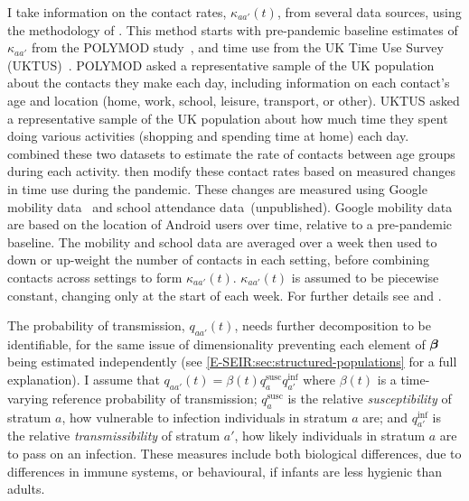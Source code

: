\documentclass[thesis.tex]{subfiles}
\begin{document}
I take information on the contact rates, $\kappa_{aa'}(t)$, from several data sources, using the methodology of \textcite{vanleeuwenTime,vanleeuwenAugmenting}.
This method starts with pre-pandemic baseline estimates of $\kappa_{aa'}$ from the POLYMOD study~\autocite{mossongSocial}, and time use from the UK Time Use Survey (UKTUS)~\autocite{UKTUS}.
POLYMOD asked a representative sample of the UK population about the contacts they make each day, including information on each contact's age and location (home, work, school, leisure, transport, or other).
UKTUS asked a representative sample of the UK population about how much time they spent doing various activities (\eg shopping and spending time at home) each day.
\Textcite{vanleeuwenAugmenting} combined these two datasets to estimate the rate of contacts between age groups during each activity.
\Textcite{birrellRealtime} then modify these contact rates based on measured changes in time use during the pandemic.
These changes are measured using Google mobility data~\autocite{googleCOVID19} and school attendance data~(unpublished).
Google mobility data are based on the location of Android users over time, relative to a pre-pandemic baseline.
The mobility and school data are averaged over a week then used to down or up-weight the number of contacts in each setting, before combining contacts across settings to form $\kappa_{aa'}(t)$.
$\kappa_{aa'}(t)$ is assumed to be piecewise constant, changing only at the start of each week.
For further details see \textcite{vanleeuwenAugmenting} and \textcite[supplementary material]{birrellRealtime}.

The probability of transmission, $q_{aa'}(t)$, needs further decomposition to be identifiable, for the same issue of dimensionality preventing each element of $\bm{\beta}$ being estimated independently (see \cref{E-SEIR:sec:structured-populations} for a full explanation).
I assume that $q_{aa'}(t) = \beta(t) q^\text{susc}_{a} q^\text{inf}_{a'}$ where $\beta(t)$ is a time-varying reference probability of transmission; $q^\text{susc}_a$ is the relative \emph{susceptibility} of stratum $a$, \ie how vulnerable to infection individuals in stratum $a$ are; and $q^\text{inf}_{a'}$ is the relative \emph{transmissibility} of stratum $a'$, \ie how likely individuals in stratum $a$ are to pass on an infection.
These measures include both biological differences, \eg due to differences in immune systems, or behavioural, \eg if infants are less hygienic than adults.
\end{document}
